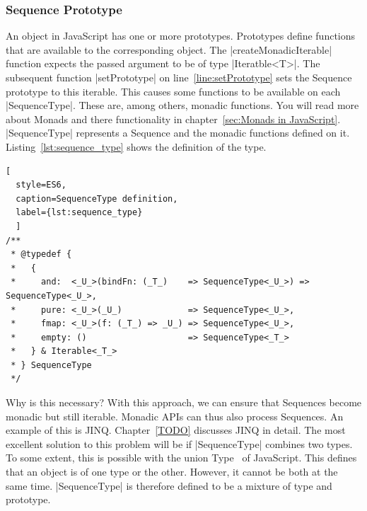 \subsubsection{Sequence Prototype}
\label{Sequence Prototype}
An object in JavaScript has one or more prototypes. Prototypes define functions
that are available to the corresponding object. The |createMonadicIterable|
function expects the passed argument to be of type |Iteratble<T>|. The subsequent
function |setPrototype| on line~\ref{line:setPrototype} sets the Sequence 
prototype to this iterable. This causes some functions to be available on each 
|SequenceType|. These are, among others, monadic functions. You will read more
about Monads and there functionality in chapter~\ref{sec:Monads in JavaScript}. 
|SequenceType| represents a Sequence and the monadic functions defined on it. 
Listing~\ref{lst:sequence_type} shows the definition of the type.

\begin{lstlisting}[
  style=ES6, 
  caption=SequenceType definition,
  label={lst:sequence_type}
  ]
/**
 * @typedef {
 *   {
 *     and:  <_U_>(bindFn: (_T_)    => SequenceType<_U_>) => SequenceType<_U_>,
 *     pure: <_U_>(_U_)             => SequenceType<_U_>,
 *     fmap: <_U_>(f: (_T_) => _U_) => SequenceType<_U_>,
 *     empty: ()                    => SequenceType<_T_>
 *   } & Iterable<_T_>
 * } SequenceType
 */
\end{lstlisting}

Why is this necessary? With this approach, we can ensure that Sequences become
monadic but still iterable. Monadic APIs can thus also process Sequences. An
example of this is JINQ. Chapter~\ref{TODO} discusses JINQ in detail. 
\newline
The most excellent solution to this problem will be if |SequenceType| combines
two types. To some extent, this is possible with the union
Type~\cite{js_doc_types} of
JavaScript. This defines that an object is of one type or the other. However, it
cannot be both at the same time. |SequenceType| is therefore defined to be a
mixture of type and prototype.

